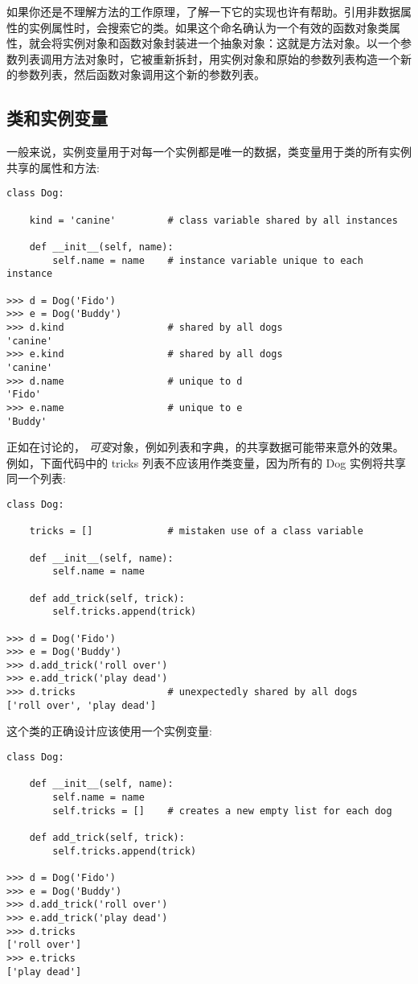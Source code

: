 如果你还是不理解方法的工作原理，了解一下它的实现也许有帮助。引用非数据属性的实例属性时，会搜索它的类。如果这个命名确认为一个有效的函数对象类属性，就会将实例对象和函数对象封装进一个抽象对象：这就是方法对象。以一个参数列表调用方法对象时，它被重新拆封，用实例对象和原始的参数列表构造一个新的参数列表，然后函数对象调用这个新的参数列表。
\subsection{类和实例变量}
一般来说，实例变量用于对每一个实例都是唯一的数据，类变量用于类的所有实例共享的属性和方法:
\begin{lstlisting}
class Dog:

    kind = 'canine'         # class variable shared by all instances

    def __init__(self, name):
        self.name = name    # instance variable unique to each instance

>>> d = Dog('Fido')
>>> e = Dog('Buddy')
>>> d.kind                  # shared by all dogs
'canine'
>>> e.kind                  # shared by all dogs
'canine'
>>> d.name                  # unique to d
'Fido'
>>> e.name                  # unique to e
'Buddy'
\end{lstlisting}
正如在讨论的， \textit{可变}对象，例如列表和字典，的共享数据可能带来意外的效果。例如，下面代码中的 tricks 列表不应该用作类变量，因为所有的 Dog 实例将共享同一个列表:
\begin{lstlisting}
class Dog:

    tricks = []             # mistaken use of a class variable

    def __init__(self, name):
        self.name = name

    def add_trick(self, trick):
        self.tricks.append(trick)

>>> d = Dog('Fido')
>>> e = Dog('Buddy')
>>> d.add_trick('roll over')
>>> e.add_trick('play dead')
>>> d.tricks                # unexpectedly shared by all dogs
['roll over', 'play dead']
\end{lstlisting}
这个类的正确设计应该使用一个实例变量:
\begin{lstlisting}
class Dog:

    def __init__(self, name):
        self.name = name
        self.tricks = []    # creates a new empty list for each dog

    def add_trick(self, trick):
        self.tricks.append(trick)

>>> d = Dog('Fido')
>>> e = Dog('Buddy')
>>> d.add_trick('roll over')
>>> e.add_trick('play dead')
>>> d.tricks
['roll over']
>>> e.tricks
['play dead']
\end{lstlisting}
